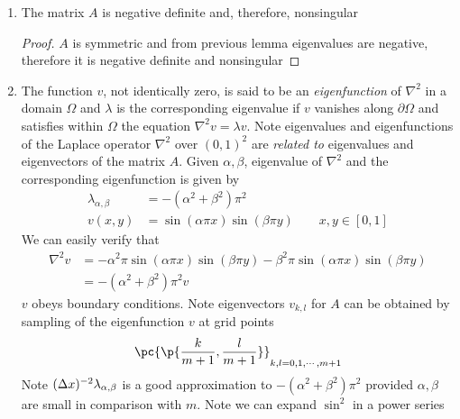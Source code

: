 \documentclass[11pt]{article}
\begin{document}
\begin{enumerate}
\begin{proof}
\[            \quad 
            k,l = 1,2,\cdots, m   
        \]
        is satisfied for some $\lambda$. It follows that $(v_{k,l})$ is an eigenvector and $\lambda$ is the corresponding eignvalue of $A$. Given $\lambda_{\alpha,\beta}$ for some $\alpha,\beta$, we show that
        \[
            v_{k,l} = \sin\p{\frac{k\alpha\pi}{m+1}} \sin \p{\frac{l\beta\pi}{m+1}}
            \quad 
            k,l = 0,1,\cdots,m+1
        \]
        is the corresponding eigenvector by verifying above formula.
    \end{proof}
    \item {} The matrix $A$ is negative definite and, therefore, nonsingular
    \begin{proof}
        $A$ is symmetric and from previous lemma eigenvalues are negative, therefore it is negative definite and nonsingular
    \end{proof}
    \item {} The function $v$, not identically zero, is said to be an \textit{eigenfunction} of $\nabla^2$ in a domain $\Omega$ and $\lambda$ is the corresponding eigenvalue if $v$ vanishes along $\partial \Omega$ and satisfies within $\Omega$ the equation $\nabla^2 v = \lambda v$. Note eigenvalues and eigenfunctions of the Laplace operator $\nabla^2$ over $(0,1)^2$ are \textit{related to} eigenvalues and eigenvectors of the matrix $A$. Given $\alpha,\beta$, eigenvalue of $\nabla^2$ and the corresponding eigenfunction is given by
    \begin{align*}
        \lambda_{\alpha,\beta} 
            &= -(\alpha^2 + \beta^2) \pi^2 \\
        v(x,y) 
            &= \sin(\alpha\pi x) \sin(\beta\pi y)
            \quad \quad 
            x,y\in [0,1]
    \end{align*}
    We can easily verify that 
    \begin{align*}
        \nabla^2 v 
        &= -\alpha^2 \pi \sin(\alpha\pi x) \sin(\beta \pi y) - \beta^2 \pi \sin(\alpha\pi x) \sin(\beta\pi y) \\
        &= -(\alpha^2 + \beta^2) \pi^2 v
    \end{align*}
    $v$ obeys boundary conditions. Note eigenvectors $v_{k,l}$ for $A$ can be obtained by sampling of the eigenfunction $v$ at grid points 
    \[
        \pc{\p{
            \frac{k}{m+1}, \frac{l}{m+1}
        }}_{k,l=0,1,\cdots,m+1}
    \]
    Note $(\Delta x)^{-2} \lambda_{\alpha,\beta}$ is a good approximation to $-(\alpha^2 + \beta^2) \pi^2$ provided $\alpha,\beta$ are small in comparison with $m$. Note we can expand $\sin^2$ in a power series

\end{enumerate}
\end{document}
